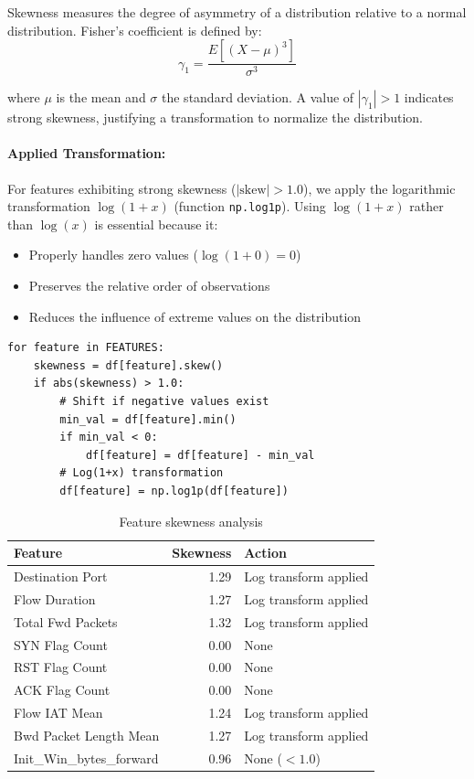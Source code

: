 \documentclass[12pt,a4paper]{article}
\begin{document}
Skewness measures the degree of asymmetry of a distribution relative to a normal distribution. Fisher's coefficient is defined by:
\begin{equation}
    \gamma_1 = \frac{E[(X - \mu)^3]}{\sigma^3}
\end{equation}

\noindent where $\mu$ is the mean and $\sigma$ the standard deviation. A value of $|\gamma_1| > 1$ indicates strong skewness, justifying a transformation to normalize the distribution.

\paragraph{Applied Transformation:} For features exhibiting strong skewness ($|\text{skew}| > 1.0$), we apply the logarithmic transformation $\log(1 + x)$ (function \texttt{np.log1p}). Using $\log(1+x)$ rather than $\log(x)$ is essential because it:
\begin{itemize}
    \item Properly handles zero values ($\log(1+0) = 0$)
    \item Preserves the relative order of observations
    \item Reduces the influence of extreme values on the distribution
\end{itemize}

\begin{lstlisting}[caption={Skewness analysis and logarithmic transformation}]
for feature in FEATURES:
    skewness = df[feature].skew()
    if abs(skewness) > 1.0:
        # Shift if negative values exist
        min_val = df[feature].min()
        if min_val < 0:
            df[feature] = df[feature] - min_val
        # Log(1+x) transformation
        df[feature] = np.log1p(df[feature])
\end{lstlisting}

\begin{table}[H]
\centering
\caption{Feature skewness analysis}
\label{tab:skewness}
\begin{tabular}{lrl}
\toprule
\textbf{Feature} & \textbf{Skewness} & \textbf{Action} \\
\midrule
Destination Port & 1.29 & Log transform applied \\
Flow Duration & 1.27 & Log transform applied \\
Total Fwd Packets & 1.32 & Log transform applied \\
SYN Flag Count & 0.00 & None \\
RST Flag Count & 0.00 & None \\
ACK Flag Count & 0.00 & None \\
Flow IAT Mean & 1.24 & Log transform applied \\
Bwd Packet Length Mean & 1.27 & Log transform applied \\
Init\_Win\_bytes\_forward & 0.96 & None ($< 1.0$) \\
\bottomrule
\end{tabular}
\end{table}
\end{document}
